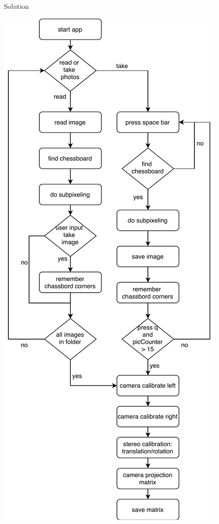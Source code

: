 \documentclass{beamer}
\begin{document}
\begin{frame}{Solution}
\begin{center}
\includegraphics[width=\textwidth,height=0.85\textheight,keepaspectratio]{images/camera_calibration_app_flowchart.pdf}
\end{center}
\end{frame}
\end{document}
